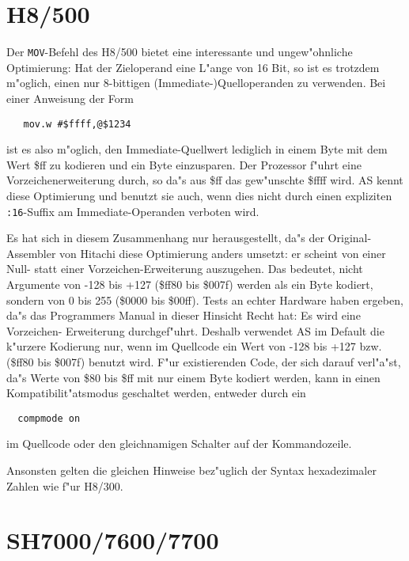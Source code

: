 \documentclass[12pt,a4paper,twoside]{report}
\newcommand{\tty}[1]{{\tt #1}}
\begin{document}

\section{H8/500}

Der {\tt MOV}-Befehl des H8/500 bietet eine interessante und ungew"ohnliche
Optimierung: Hat der Zieloperand eine L"ange von 16 Bit, so ist es trotzdem
m"oglich, einen nur 8-bittigen (Immediate-)Quelloperanden zu verwenden.  Bei
einer Anweisung der Form
\begin{verbatim}
   mov.w #$ffff,@$1234
\end{verbatim}
ist es also m"oglich, den Immediate-Quellwert lediglich in einem Byte mit
dem Wert \$ff zu kodieren und ein Byte einzusparen.  Der Prozessor f"uhrt
eine Vorzeichenerweiterung durch, so da"s aus \$ff das gew"unschte \$ffff
wird.  AS kennt diese Optimierung und benutzt sie auch, wenn dies nicht
durch einen expliziten \tty{:16}-Suffix am Immediate-Operanden verboten
wird.

Es hat sich in diesem Zusammenhang nur herausgestellt, da"s der Original-Assembler
von Hitachi diese Optimierung anders umsetzt: er scheint von einer Null- statt
einer Vorzeichen-Erweiterung auszugehen.  Das bedeutet, nicht Argumente von
-128 bis +127 (\$ff80 bis \$007f) werden als ein Byte kodiert, sondern von 0 bis
255 (\$0000 bis \$00ff).  Tests an echter Hardware haben ergeben, da"s
das Programmers Manual in dieser Hinsicht Recht hat: Es wird eine Vorzeichen-
Erweiterung durchgef"uhrt.  Deshalb verwendet AS im Default die k"urzere
Kodierung nur, wenn im Quellcode ein Wert von -128 bis +127 bzw. (\$ff80 bis
\$007f) benutzt wird.  F"ur existierenden Code, der sich darauf verl"a"st,
da"s Werte von \$80 bis \$ff mit nur einem Byte kodiert werden, kann in einen
Kompatibilit"atsmodus geschaltet werden, entweder durch ein
\begin{verbatim}
  compmode on
\end{verbatim}
im Quellcode oder den gleichnamigen Schalter auf der Kommandozeile.

Ansonsten gelten die gleichen Hinweise bez"uglich der Syntax hexadezimaler
Zahlen wie f"ur H8/300.


\section{SH7000/7600/7700}
\end{document}
